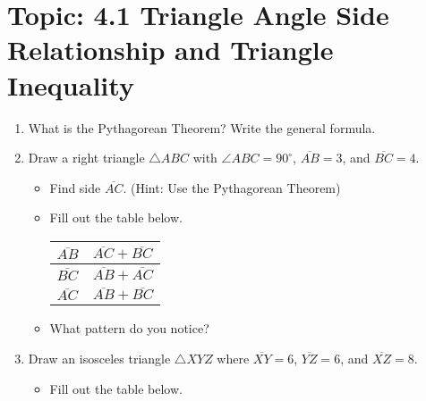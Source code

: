 \documentclass[12pt,letterpaper]{article}
\begin{document}
\newpage
\section*{Topic: 4.1 Triangle Angle Side Relationship and Triangle Inequality}
\begin{enumerate}
    \item What is the Pythagorean Theorem? Write the general formula.
    \item Draw a right triangle $\triangle ABC$ with $\angle ABC = 90^{\circ}$, $\overline{AB} = 3$, and $\overline{BC} = 4$.
          \begin{itemize}
              \item Find side $\overline{AC}$. (Hint: Use the Pythagorean Theorem)
              \item Fill out the table below.

                    \begin{tabularx}{0.95\textwidth} {
                            | >{\centering\arraybackslash}X
                            | >{\centering\arraybackslash}X |}
                        \hline
                        $\overline{AB}$\vspace{10mm} & $\overline{AC} + \overline{BC}$ \\
                        \hline
                        $\overline{BC}$\vspace{10mm} & $\overline{AB} + \overline{AC}$ \\
                        \hline
                        $\overline{AC}$\vspace{10mm} & $\overline{AB} + \overline{BC}$ \\
                        \hline
                    \end{tabularx}
              \item What pattern do you notice?
          \end{itemize}
    \item Draw an isosceles triangle $\triangle XYZ$ where $\overline{XY} = 6$, $\overline{YZ} = 6$, and $\overline{XZ} = 8$.
          \begin{itemize}
              \item Fill out the table below.


\end{itemize}
\end{enumerate}
\end{document}
